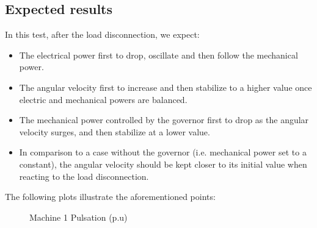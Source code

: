 \documentclass[a4paper, 12pt]{report}
\begin{document}
\subsection*{Expected results}


In this test, after the load disconnection, we expect:

\begin{itemize}
\item The electrical power first to drop, oscillate and then follow the mechanical power.
\item The angular velocity first to increase and then stabilize to a higher value once electric and mechanical powers are balanced.
\item The mechanical power controlled by the governor first to drop as the angular velocity surges, and then stabilize at a lower value.
\item In comparison to a case without the governor (i.e. mechanical power set to a constant), the angular velocity should be kept closer to its initial value when reacting to the load disconnection. 
\end{itemize}

The following plots illustrate the aforementioned points:

\begin{figure}[H]
  \caption{Machine 1 Pulsation (p.u)}
\end{figure}
\end{document}
